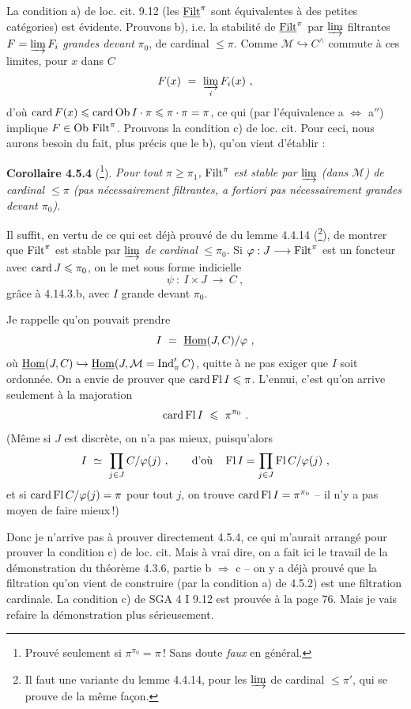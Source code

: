 La condition a) de loc. cit. 9.12 (les $\underline{\mathrm{Filt}}^{\pi}$ sont équivalentes à des petites catégories) est évidente. Prouvons b), i.e. la stabilité de $\underline{\mathrm{Filt}}^{\pi}$ par $\varinjlim$ filtrantes $F = \varinjlim F_i$ \textit{grandes devant} $\pi_0$, de cardinal $\leqslant \pi$. Comme $\mathcal{M} \hookrightarrow C^{\wedge}$ commute à ces limites, pour $x$ dans $C$
\[
F(x) \ =\ \varinjlim_{i} F_i(x)\ ,
\]
d'où $\operatorname{card} F(x) \leqslant \operatorname{card}\mathrm{Ob}\, I \cdot \pi \leqslant \pi \cdot \pi = \pi$, ce qui (par l'équivalence a $\Longleftrightarrow$ a$''$) implique $F \in \mathrm{Ob}\,\operatorname{Filt}^{\pi}$. Prouvons la condition c) de loc. cit. Pour ceci, nous aurons besoin du fait, plus précis que le b), qu'on vient d'établir :

\textbf{Corollaire 4.5.4} (\footnote{Prouvé seulement si $\pi^{\pi_0} = \pi$\,! Sans doute \textit{faux} en général.}). \textit{Pour tout $\pi \geqslant \pi_1$,} $\operatorname{Filt}^{\pi}$ \textit{est stable par $\varinjlim$ (dans $\mathcal{M}$) de cardinal $\leqslant \pi$ (pas nécessairement filtrantes, a fortiori pas nécessairement grandes devant $\pi_0$).}

Il suffit, en vertu de ce qui est déjà prouvé de du lemme 4.4.14 (\footnote{Il faut une variante du lemme 4.4.14, pour les $\varinjlim$ de cardinal $\leqslant \pi'$, qui se prouve de la même façon.}), de montrer que $\operatorname{Filt}^{\pi}$ %
est stable par $\varinjlim$ \textit{de cardinal} $\leqslant \pi_0$. Si $\varphi : J \longrightarrow \operatorname{Filt}^{\pi}$ est un foncteur avec $\operatorname{card} J \leqslant \pi_0$, on le met sous forme indicielle
\[
\psi\ :\ I \times J \ \longrightarrow\ C\ ,
\]
grâce à 4.14.3.b, avec $I$ grande devant $\pi_0$.


Je rappelle qu'on pouvait prendre
\[
I \ =\ \uHom(J,C)/\varphi\ ,
\]
où $\underline{\mathrm{Hom}}(J,C) \hookrightarrow \underline{\mathrm{Hom}}(J, \mathcal{M} = \operatorname{Ind}'_{\pi}C)$, quitte à ne pas exiger que $I$ soit ordonnée. On a envie de prouver que $\operatorname{card}\operatorname{Fl} I \leqslant \pi$. L'ennui, c'est qu'on arrive seulement à la majoration
\[
\operatorname{card}\operatorname{Fl} I \ \leqslant\ \pi^{\pi_0}\ .
\]
(Même si $J$ est discrète, on n'a pas mieux, puisqu'alors
\[
I \ \simeq\ \prod_{j\in J} C/\varphi(j)\ , \qquad \text{d'où} \quad \operatorname{Fl} I = \prod_{j\in J} \operatorname{Fl} C/\varphi(j)\ ,
\]
et si $\operatorname{card}\operatorname{Fl} C/\varphi(j) = \pi$ pour tout $j$, on trouve $\operatorname{card}\operatorname{Fl} I = \pi^{\pi_0}$ -- il n'y a pas moyen de faire mieux\,!)

Donc je n'arrive pas à prouver directement 4.5.4, ce qui m'aurait arrangé pour prouver la condition c) de loc. cit. Mais à vrai dire, on a fait ici le travail de la démonstration du théorème 4.3.6, partie b $\Longrightarrow$ c -- on y a déjà prouvé que la filtration qu'on vient de construire (par la condition a) de 4.5.2) est une filtration cardinale. La condition c) de SGA 4 I 9.12 est prouvée à la page 76. Mais je vais refaire
la démonstration plus sérieusement.

